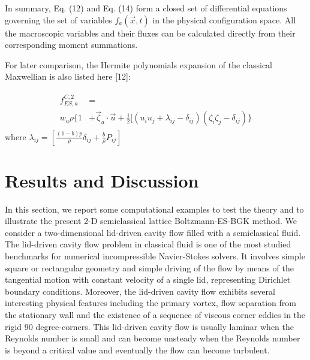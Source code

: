 \documentclass[doublecol]{epl2}
\begin{document}
In summary, Eq. (12) and Eq. (14) form a closed set of differential equations governing the set of variables $f_a(\vec x,t)$ in the physical configuration space.  All the macroscopic variables and their fluxes can be calculated directly from their corresponding moment summations.

For later comparison, the Hermite polynomials expansion of the classical Maxwellian is also listed here [12]:

\begin{align}
\begin{split}
f_{ES,a}^{C,2} &=  \\
w_a \rho \{ 1 &+ \vec \zeta_a \cdot \vec u + \frac{1}{2} [( u_i u_j +\lambda_{ij} -\delta_{ij})(\zeta_i \zeta_j - \delta_{ij}) \}
\end{split}
\end{align}
where $\lambda_{i j} = \left[\frac{(1-b)p}{\rho} \delta_{i j}+ \frac{b}{\rho}P_{i j } \right]$ \\


\section{Results and Discussion}

In this section, we report some computational examples to test the theory and to illustrate the present 2-D semiclassical lattice Boltzmann-ES-BGK method. We consider a two-dimensional lid-driven cavity flow filled with a semiclassical fluid. The lid-driven cavity flow problem in classical fluid is one of the most studied benchmarks for numerical incompressible Navier-Stokes solvers. It involves simple square or rectangular geometry and simple driving of the flow by means of the tangential motion with constant velocity of a single lid, representing Dirichlet boundary conditions. Moreover, the lid-driven cavity flow exhibits several interesting physical features including the primary vortex, flow separation from the stationary wall and the existence of a sequence of viscous corner eddies in the rigid 90 degree-corners. This lid-driven cavity flow is usually laminar when the Reynolds number is small and can become unsteady when the Reynolds number is beyond a critical value and eventually the flow can become turbulent.
\end{document}
